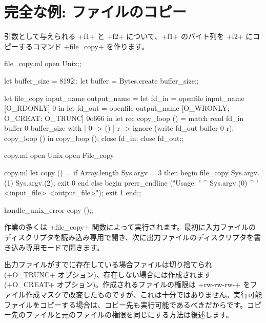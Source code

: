 \section{\label{ex/filecopy}完全な例: ファイルのコピー}

引数として与えられる \ml+f1+ と \ml+f2+ について、\ml+f1+ のバイト列を \ml+f2+ にコピーするコマンド \ml+file_copy+ を作ります。
%
\begin{listingcodefile}{file_copy.ml}
open Unix;;

let buffer_size = 8192;;
let buffer = Bytes.create buffer_size;;

let file_copy input_name output_name =
  let fd_in = openfile input_name [O_RDONLY] 0 in
  let fd_out = openfile output_name [O_WRONLY; O_CREAT; O_TRUNC] 0o666 in
  let rec copy_loop () = match read fd_in buffer 0 buffer_size with
    |  0 -> ()
    | r -> ignore (write fd_out buffer 0 r); copy_loop ()
  in
  copy_loop ();
  close fd_in;
  close fd_out;;
\end{listingcodefile}
%
\begin{codefile}{copy.ml}
open Unix
open File_copy
\end{codefile}
%
\begin{listingcodefile}{copy.ml}
let copy () =
  if Array.length Sys.argv = 3 then begin
    file_copy Sys.argv.(1) Sys.argv.(2);
    exit 0
  end else begin
    prerr_endline
      ("Usage: " ^ Sys.argv.(0) ^ " <input_file> <output_file>");
    exit 1
  end;;

handle_unix_error copy ();;
\end{listingcodefile}
%

作業の多くは \ml+file_copy+ 関数によって実行されます。最初に入力ファイルのディスクリプタを読み込み専用で開き、次に出力ファイルのディスクリプタを書き込み専用モードで開きます。

出力ファイルがすでに存在している場合ファイルは切り捨てられ (\ml+O_TRUNC+ オプション)、存在しない場合には作成されます (\ml+O_CREAT+ オプション)。作成されるファイルの権限は \ml+rw-rw-rw-+ をファイル作成マスクで改変したものですが、これは十分ではありません。実行可能ファイルをコピーする場合は、コピー先も実行可能であるべきだからです。コピー先のファイルと元のファイルの権限を同じにする方法は後述します。

